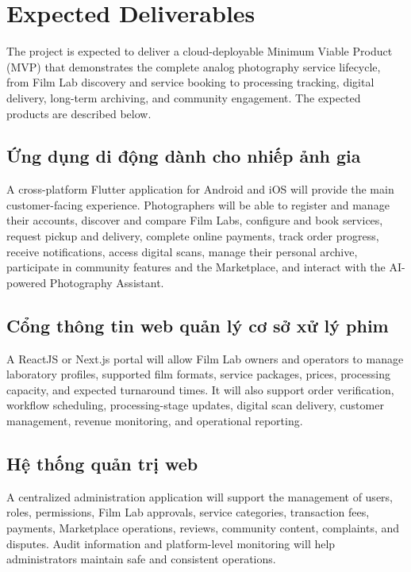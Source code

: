 
\section{Expected Deliverables}


The project is expected to deliver a cloud-deployable Minimum Viable Product
(MVP) that demonstrates the complete analog photography service lifecycle,
from Film Lab discovery and service booking to processing tracking, digital
delivery, long-term archiving, and community engagement. The expected products
are described below.

\subsection*{Ứng dụng di động dành cho nhiếp ảnh gia}

A cross-platform Flutter application for Android and iOS will provide the main
customer-facing experience. Photographers will be able to register and manage
their accounts, discover and compare Film Labs, configure and book services,
request pickup and delivery, complete online payments, track order progress,
receive notifications, access digital scans, manage their personal archive,
participate in community features and the Marketplace, and interact with the
AI-powered Photography Assistant.

\subsection*{Cổng thông tin web quản lý cơ sở xử lý phim}

A ReactJS or Next.js portal will allow Film Lab owners and operators to manage
laboratory profiles, supported film formats, service packages, prices,
processing capacity, and expected turnaround times. It will also support order
verification, workflow scheduling, processing-stage updates, digital scan
delivery, customer management, revenue monitoring, and operational reporting.

\subsection*{Hệ thống quản trị web}

A centralized administration application will support the management of users,
roles, permissions, Film Lab approvals, service categories, transaction fees,
payments, Marketplace operations, reviews, community content, complaints, and
disputes. Audit information and platform-level monitoring will help
administrators maintain safe and consistent operations.

